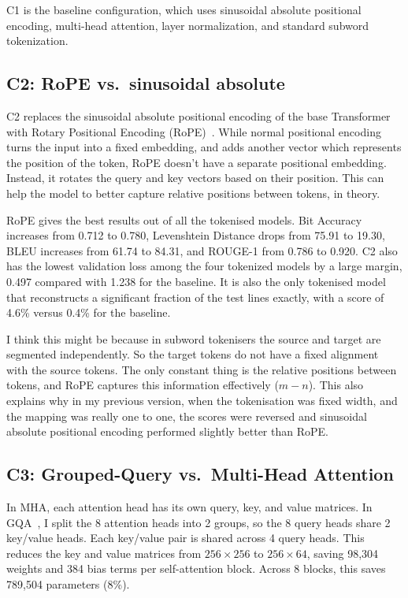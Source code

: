 \documentclass[12pt]{article}
\begin{document}
C1 is the baseline configuration, which uses sinusoidal absolute positional
encoding, multi-head attention, layer normalization, and standard subword
tokenization.

\subsection{C2: RoPE vs.\ sinusoidal absolute}

C2 replaces the sinusoidal absolute positional encoding of the base
Transformer~\cite{vaswani2017attention} with Rotary Positional Encoding
(RoPE)~\cite{su2021roformer}. While normal positional encoding turns the input into a fixed
embedding, and adds another vector which represents the position of the token,
RoPE doesn't have a separate positional embedding. Instead, it rotates the query
and key vectors based on their position. This can help the model to better
capture relative positions between tokens, in theory.

RoPE gives the best results out of all the tokenised models. Bit Accuracy increases from 
0.712 to 0.780, Levenshtein Distance drops from 75.91 to 19.30, BLEU increases from 61.74 
to 84.31, and ROUGE-1 from 0.786 to 0.920. C2 also has the lowest validation loss among 
the four tokenized models by a large margin, 0.497 compared with 1.238 for the baseline. 
It is also the only tokenised model that reconstructs a significant fraction of the test 
lines exactly, with a score of 4.6\% versus 0.4\% for the baseline.

I think this might be because in subword tokenisers the source and target are 
segmented independently. So the target tokens do not have a fixed alignment with the 
source tokens. The only constant thing is the relative positions between tokens, 
and RoPE captures this information effectively ($m - n$). This also explains why 
in my previous version, when the tokenisation was fixed width, and the mapping was 
really one to one, the scores were reversed and sinusoidal absolute positional encoding
performed slightly better than RoPE.

\subsection{C3: Grouped-Query vs.\ Multi-Head Attention}

In MHA, each attention head has its own query, key, and value matrices. In
GQA~\cite{ainslie2023gqa}, I split the 8 attention heads into 2 groups, so the 8 query heads share 2
key/value heads. Each key/value pair is shared across 4 query heads. This
reduces the key and value matrices from $256 \times 256$ to $256 \times 64$,
saving 98,304 weights and 384 bias terms per self-attention block. Across 8
blocks, this saves 789,504 parameters (8\%).
\end{document}
